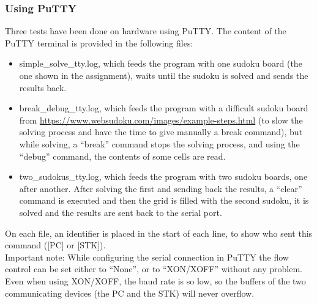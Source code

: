 \documentclass[12pt, a4]{article}
\begin{document}
\subsubsection*{Using PuTTY}
Three tests have been done on hardware using PuTTY. The content of the PuTTY terminal is provided in the following files:
\begin{itemize}
\item simple\_solve\_tty.log, which feeds the program with one sudoku board (the one shown in the assignment), waits until the sudoku is solved and sends the results back.
\item break\_debug\_tty.log, which feeds the program with a difficult sudoku board from \url{https://www.websudoku.com/images/example-steps.html} (to slow the solving process and have the time to give manually a break command), but while solving, a “break” command stops the solving process, and using the “debug” command, the contents of some cells are read.
\item two\_sudokus\_tty.log, which feeds the program with two sudoku boards, one after another. After solving the first and sending back the results, a “clear” command is executed and then the grid is filled with the second sudoku, it is solved and the results are sent back to the serial port.
\end{itemize}
On each file, an identifier is placed in the start of each line, to show who sent this command ([PC] or [STK]).\\
Important note: While configuring the serial connection in PuTTY the flow control can be set either to ``None'', or to ``XON/XOFF'' without any problem. Even when using XON/XOFF, the baud rate is so low, so the buffers of the two communicating devices (the PC and the STK) will never overflow.
\end{document}
